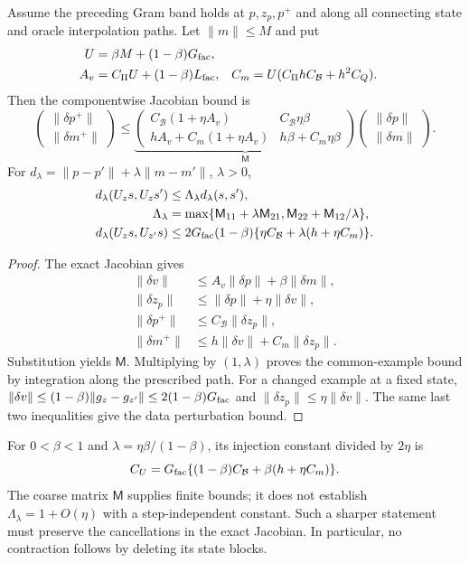 \begin{corollary}
Assume the preceding Gram band holds at $p,z_p,p^+$ and along all
connecting state and oracle interpolation paths. Let $\|m\|\leq M$ and put
\begin{align}
U&=\beta M+(1-\beta)G_{\rm fac},\\
A_v&=C_\Pi U+(1-\beta)L_{\rm fac},&
C_m&=U(C_\Pi hC_{\mathcal B}+h^2C_Q).
\end{align}
Then the componentwise Jacobian bound is
\begin{equation}
\begin{pmatrix}\|\delta p^+\|\\\|\delta m^+\|\end{pmatrix}
\leq
\underbrace{\begin{pmatrix}
C_{\mathcal B}(1+\eta A_v)&C_{\mathcal B}\eta\beta\\
hA_v+C_m(1+\eta A_v)&h\beta+C_m\eta\beta
\end{pmatrix}}_{\mathsf M}
\begin{pmatrix}\|\delta p\|\\\|\delta m\|\end{pmatrix}.
\label{eq:rigid-state-sensitivity-matrix}
\end{equation}
For $d_\lambda=\|p-p'\|+\lambda\|m-m'\|$, $\lambda>0$,
\begin{align}
d_\lambda(U_zs,U_zs')
&\leq\Lambda_\lambda d_\lambda(s,s'),\\
\Lambda_\lambda
&=\max\{\mathsf M_{11}+\lambda\mathsf M_{21},
\mathsf M_{22}+\mathsf M_{12}/\lambda\},\\
d_\lambda(U_zs,U_{z'}s)
&\leq2G_{\rm fac}(1-\beta)
\{\eta C_{\mathcal B}+\lambda(h+\eta C_m)\}.
\label{eq:rigid-explicit-state-sensitivity}
\end{align}
\end{corollary}
\begin{proof}
The exact Jacobian gives
\begin{align}
\|\delta v\|&\leq A_v\|\delta p\|+\beta\|\delta m\|,\\
\|\delta z_p\|&\leq\|\delta p\|+\eta\|\delta v\|,\\
\|\delta p^+\|&\leq C_{\mathcal B}\|\delta z_p\|,\\
\|\delta m^+\|&\leq h\|\delta v\|+C_m\|\delta z_p\|.
\end{align}
Substitution yields $\mathsf M$. Multiplying by $(1,\lambda)$ proves
the common-example bound by integration along the prescribed path.
For a changed example at a fixed state,
$\|\delta v\|\leq(1-\beta)\|g_z-g_{z'}\|
\leq2(1-\beta)G_{\rm fac}$ and
$\|\delta z_p\|\leq\eta\|\delta v\|$.
The same last two inequalities give the data perturbation bound.
\end{proof}
For $0<\beta<1$ and $\lambda=\eta\beta/(1-\beta)$, its injection
constant divided by $2\eta$ is
\begin{equation}
C_U=G_{\rm fac}\{(1-\beta)C_{\mathcal B}
+\beta(h+\eta C_m)\}.
\end{equation}
The coarse matrix $\mathsf M$ supplies finite bounds; it does not
establish $\Lambda_\lambda=1+O(\eta)$ with a step-independent constant.
Such a sharper statement must preserve the cancellations in the exact
Jacobian. In particular, no contraction follows by deleting its state
blocks.
